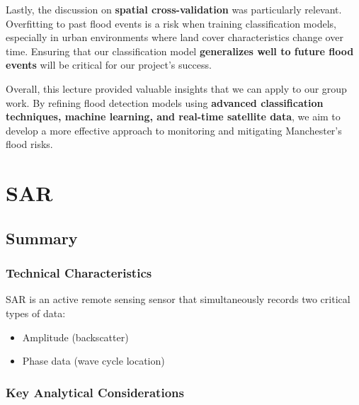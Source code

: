 \documentclass[
  letterpaper,
]{scrbook}
\begin{document}
Lastly, the discussion on \textbf{spatial cross-validation} was
particularly relevant. Overfitting to past flood events is a risk when
training classification models, especially in urban environments where
land cover characteristics change over time. Ensuring that our
classification model \textbf{generalizes well to future flood events}
will be critical for our project's success.

Overall, this lecture provided valuable insights that we can apply to
our group work. By refining flood detection models using
\textbf{advanced classification techniques, machine learning, and
real-time satellite data}, we aim to develop a more effective approach
to monitoring and mitigating Manchester's flood risks.


\chapter{SAR}\label{sar}

\section{Summary}\label{summary-5}

\subsection{Technical Characteristics}\label{technical-characteristics}

SAR is an active remote sensing sensor that simultaneously records two
critical types of data:

\begin{itemize}
\item
  Amplitude (backscatter)
\item
  Phase data (wave cycle location)
\end{itemize}

\subsection{Key Analytical
Considerations}\label{key-analytical-considerations}
\end{document}
